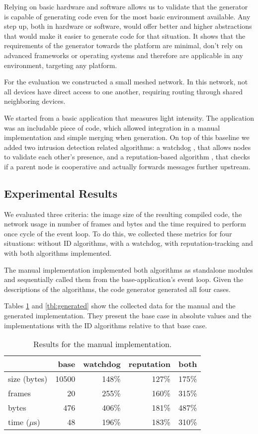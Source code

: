 \documentclass[conference]{IEEEtran}
\begin{document}
Relying on basic hardware and software allows us to validate that the generator
is capable of generating code even for the most basic environment available.
Any step up, both in hardware or software, would offer better and higher
abstractions that would make it easier to generate code for that situation. It
shows that the requirements of the generator towards the platform are minimal,
don't rely on advanced frameworks or operating systems and therefore are
applicable in any environment, targeting any platform.

For the evaluation we constructed a small meshed network. In this network, not
all devices have direct access to one another, requiring routing through shared
neighboring devices.

We started from a basic application that measures light intensity. The
application was an includable piece of code, which allowed integration in a
manual implementation and simple merging when generation. On top of this
baseline we added two intrusion detection related algorithms: a
watchdog \cite{mishra2004intrusion}, that allows nodes to validate each other's
presence, and a reputation-based algorithm \cite{ganeriwal2008reputation}, that
checks if a parent node is cooperative and actually forwards messages further
upstream.

\subsection{Experimental Results}

We evaluated three criteria: the image size of the resulting compiled code, the
network usage in number of frames and bytes and the time required to perform
once cycle of the event loop. To do this, we collected these metrics for four
situations: without ID algorithms, with a watchdog, with reputation-tracking
and with both algorithms implemented.

The manual implementation implemented both algorithms as standalone modules and
sequentially called them from the base-application's event loop. Given the
\NAME descriptions of the algorithms, the code generator generated all four
cases.

Tables \ref{tbl:manual} and \ref{tbl:generated} show the collected data for the
manual and the generated implementation. They present the base case in absolute
values and the implementations with the ID algorithms relative to that base
case.

\begin{table}[H]
  \centering
  \begin{tabular}{lrrrr}
  \hline
      & base & watchdog & reputation & both\\
  \hline
  size (bytes) & 10500 & 148\% & 127\% & 175\%\\
  frames & 20 & 255\% & 160\% & 315\%\\
  bytes & 476 & 406\% & 181\% & 487\%\\
  time ($\mu$s) & 48 & 196\% & 183\% & 310\%\\
  \hline
  \end{tabular}
  \caption{Results for the manual implementation.}
  \label{tbl:manual}
\end{table}
\end{document}
